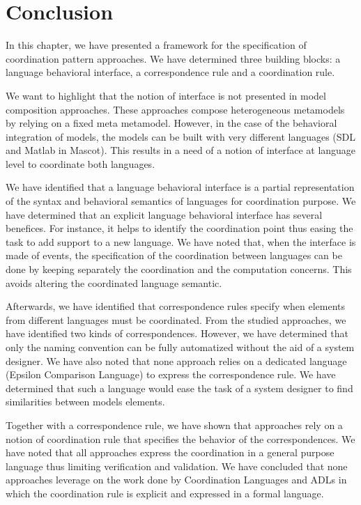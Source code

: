 \section{Conclusion}

In this chapter, we have presented a framework for the specification of coordination pattern approaches. We have determined three building blocks: a language behavioral interface, a correspondence rule and a coordination rule.    

We want to highlight that the notion of interface is not presented in model composition approaches. These approaches compose heterogeneous metamodels by relying on a fixed meta metamodel. However, in the case of the behavioral integration of models, the models can be built with very different languages (\eg SDL and Matlab in Mascot). This results in a need of a notion of interface at language level to coordinate both languages.   

We have identified that a language behavioral interface is a partial representation of the syntax and behavioral semantics of languages for coordination purpose. We have determined that an explicit language behavioral interface has several benefices. For instance, it helps to identify the coordination point thus easing the task to add support to a new language. We have noted that, when the interface is made of events, the specification of the coordination between languages can be done by keeping separately the coordination and the computation concerns. This avoids altering the coordinated language semantic.

Afterwards, we have identified that correspondence rules specify when elements from different languages must be coordinated. From the studied approaches, we have identified two kinds of correspondences. However, we have determined that only the naming convention can be fully automatized without the aid of a system designer. We have also noted that none approach relies on a dedicated language (\eg Epsilon Comparison Language) to express the correspondence rule. We have determined that such a language would ease the task of a system designer to find similarities between models elements.  

Together with a correspondence rule, we have shown that approaches rely on a notion of coordination rule that specifies the behavior of the correspondences. We have noted that all approaches express the coordination in a general purpose language thus limiting verification and validation. We have concluded that none approaches leverage on the work done by Coordination Languages and ADLs in which the coordination rule is explicit and expressed in a formal language.  

